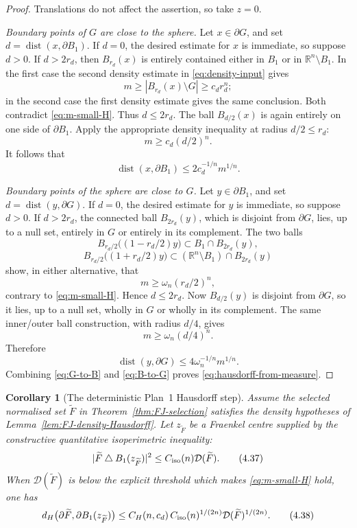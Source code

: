 \documentclass[11pt]{amsart}
\newtheorem{corollary}[theorem]{Corollary}
\theoremstyle{definition}
\newcommand{\R}{\mathbb R}
\newcommand{\Def}{\mathcal D}
\begin{document}
\begin{proof}
Translations do not affect the assertion, so take \(z=0\).

\emph{Boundary points of \(G\) are close to the sphere.}
Let \(x\in\partial G\), and set \(d=\operatorname{dist}(x,\partial B_1)\).
If \(d=0\), the desired estimate for \(x\) is immediate, so suppose
\(d>0\).
If \(d>2r_d\), then \(B_{r_d}(x)\) is entirely contained either in \(B_1\)
or in \(\R^n\setminus B_1\).  In the first case the second density estimate
in \eqref{eq:density-input} gives
\[
   m\ge|B_{r_d}(x)\setminus G|\ge c_dr_d^n;
\]
in the second case the first density estimate gives the same conclusion.
Both contradict \eqref{eq:m-small-H}.  Thus \(d\le2r_d\).
The ball \(B_{d/2}(x)\) is again entirely on one side of \(\partial B_1\).
Apply the appropriate density inequality at radius \(d/2\le r_d\):
\[
   m\ge c_d(d/2)^n.
\]
It follows that
\[
   \operatorname{dist}(x,\partial B_1)
   \le2c_d^{-1/n}m^{1/n}.
\tag{4.35}\label{eq:G-to-B}
\]

\emph{Boundary points of the sphere are close to \(G\).}
Let \(y\in\partial B_1\), and set
\(d=\operatorname{dist}(y,\partial G)\).
If \(d=0\), the desired estimate for \(y\) is immediate, so suppose
\(d>0\).
If \(d>2r_d\), the connected ball \(B_{2r_d}(y)\), which is disjoint from
\(\partial G\), lies, up to a null set, entirely in \(G\) or entirely in
its complement.
The two balls
\[
   B_{r_d/2}\bigl((1-r_d/2)y\bigr)\subset B_1\cap B_{2r_d}(y),
\]
\[
   B_{r_d/2}\bigl((1+r_d/2)y\bigr)
   \subset(\R^n\setminus B_1)\cap B_{2r_d}(y)
\]
show, in either alternative, that
\[
   m\ge\omega_n(r_d/2)^n,
\]
contrary to \eqref{eq:m-small-H}.  Hence \(d\le2r_d\).
Now \(B_{d/2}(y)\) is disjoint from \(\partial G\), so it lies, up to a
null set, wholly in \(G\) or wholly in its complement.  The same inner/outer ball construction,
with radius \(d/4\), gives
\[
   m\ge\omega_n(d/4)^n.
\]
Therefore
\[
   \operatorname{dist}(y,\partial G)
   \le4\omega_n^{-1/n}m^{1/n}.
\tag{4.36}\label{eq:B-to-G}
\]
Combining \eqref{eq:G-to-B} and \eqref{eq:B-to-G} proves
\eqref{eq:hausdorff-from-measure}.
\end{proof}

\begin{corollary}[The deterministic Plan~1 Hausdorff step]\label{cor:FJ-Hausdorff}
Assume the selected normalised set \(\widetilde F\) in
Theorem~\ref{thm:FJ-selection} satisfies the density hypotheses of
Lemma~\ref{lem:FJ-density-Hausdorff}.  Let \(z_{\widetilde F}\) be a
Fraenkel centre supplied by the constructive quantitative isoperimetric
inequality:
\[
   |\widetilde F\mathbin{\triangle}B_1(z_{\widetilde F})|^2
   \le C_{\rm iso}(n)\Def(\widetilde F).
\tag{4.37}\label{eq:FMP-selected}
\]
When \(\Def(\widetilde F)\) is below the explicit threshold which makes
\eqref{eq:m-small-H} hold, one has
\[
   d_H\bigl(\partial\widetilde F,\partial B_1(z_{\widetilde F})\bigr)
   \le C_H(n,c_d)\,C_{\rm iso}(n)^{1/(2n)}
       \Def(\widetilde F)^{1/(2n)}.
\tag{4.38}\label{eq:selected-Hausdorff}
\]
\end{corollary}
\end{document}
